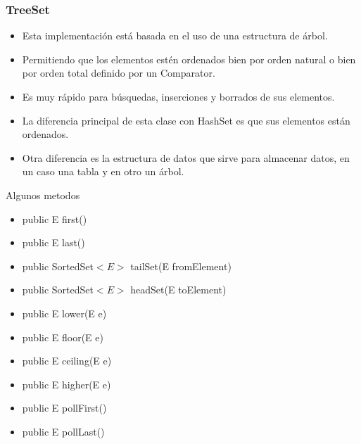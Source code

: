 \documentclass{beamer}
\begin{document}
\begin{frame}
\frametitle{TreeSet}
\begin{itemize}[<+->]
\item Esta implementación está basada en el uso de una estructura de árbol.
\item Permitiendo que los elementos estén ordenados bien por orden natural o bien por orden total definido por un Comparator.
\item Es muy rápido para búsquedas, inserciones y borrados de sus elementos.
\item La diferencia principal de esta clase con HashSet es que sus elementos están ordenados.
\item Otra diferencia es la estructura de datos que sirve para almacenar datos, en un caso una tabla y en otro un árbol.	
\end{itemize}
\pause
\begin{block}{Algunos metodos}
\begin{multicols}{2}
\begin{footnotesize}
\begin{itemize}[<+->]
\item public E first()
\item public E last()
\item public SortedSet$<E>$ tailSet(E fromElement)
\item public SortedSet$<E>$ headSet(E toElement)
\item public E lower(E e)
\item public E floor(E e)
\item public E ceiling(E e)
\item public E higher(E e)
\item public E pollFirst()
\item public E pollLast()
\end{itemize}
\end{footnotesize}
\end{multicols}
\end{block}
\end{frame}
\end{document}
